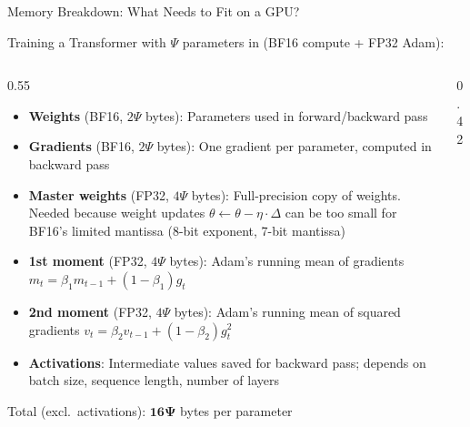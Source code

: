 \begin{frame}{Memory Breakdown: What Needs to Fit on a GPU?}

  Training a Transformer with $\Psi$ parameters in  (BF16 compute + FP32 Adam):

  \vspace{0.3em}
  \begin{columns}
    \begin{column}{0.55\textwidth}
      \begin{itemize}
        \item \textbf{Weights} (BF16, $2\Psi$ bytes): Parameters used in forward/backward pass
        \item \textbf{Gradients} (BF16, $2\Psi$ bytes): One gradient per parameter, computed in backward pass
        \item \textbf{Master weights} (FP32, $4\Psi$ bytes): Full-precision copy of weights. Needed because weight updates $\theta \leftarrow \theta - \eta \cdot \Delta$ can be too small for BF16's limited mantissa (8-bit exponent, 7-bit mantissa)
        \item \textbf{1st moment} (FP32, $4\Psi$ bytes): Adam's running mean of gradients $m_t = \beta_1 m_{t-1} + (1-\beta_1) g_t$
        \item \textbf{2nd moment} (FP32, $4\Psi$ bytes): Adam's running mean of squared gradients $v_t = \beta_2 v_{t-1} + (1-\beta_2) g_t^2$
        \item \textbf{Activations}: Intermediate values saved for backward pass; depends on batch size, sequence length, number of layers
      \end{itemize}

      \vspace{0.3em}
      Total (excl.\ activations): $\mathbf{16\Psi}$ bytes per parameter
    \end{column}
    \begin{column}{0.42\textwidth}
\end{column}
\end{columns}
\end{frame}

